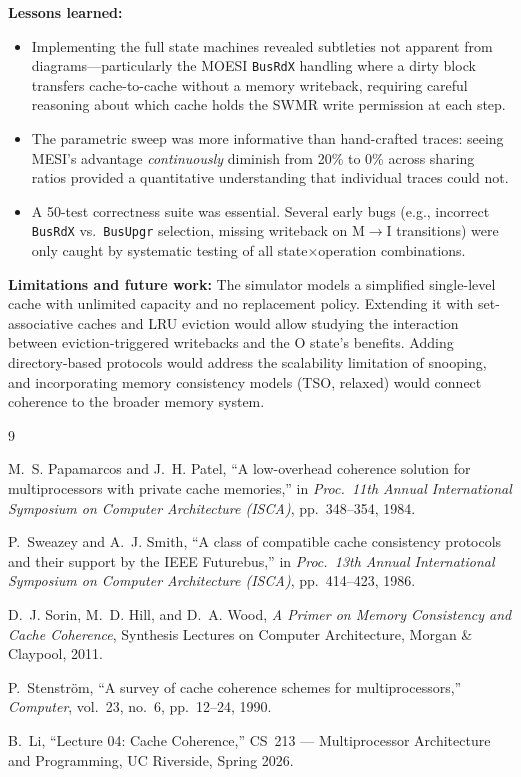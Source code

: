 \documentclass[10pt,twocolumn]{article}
\begin{document}
\textbf{Lessons learned:}
\begin{itemize}[nosep]
  \item Implementing the full state machines revealed subtleties not apparent from diagrams---particularly the MOESI \texttt{BusRdX} handling where a dirty block transfers cache-to-cache without a memory writeback, requiring careful reasoning about which cache holds the SWMR write permission at each step.
  \item The parametric sweep was more informative than hand-crafted traces: seeing MESI's advantage \emph{continuously} diminish from 20\% to 0\% across sharing ratios provided a quantitative understanding that individual traces could not.
  \item A 50-test correctness suite was essential. Several early bugs (e.g., incorrect \texttt{BusRdX} vs.\ \texttt{BusUpgr} selection, missing writeback on M$\to$I transitions) were only caught by systematic testing of all state$\times$operation combinations.
\end{itemize}

\textbf{Limitations and future work:} The simulator models a simplified single-level cache with unlimited capacity and no replacement policy. Extending it with set-associative caches and LRU eviction would allow studying the interaction between eviction-triggered writebacks and the O state's benefits. Adding directory-based protocols would address the scalability limitation of snooping, and incorporating memory consistency models (TSO, relaxed) would connect coherence to the broader memory system.


\begin{thebibliography}{9}

M.~S. Papamarcos and J.~H. Patel,
``A low-overhead coherence solution for multiprocessors with private cache memories,''
in \emph{Proc.\ 11th Annual International Symposium on Computer Architecture (ISCA)}, pp.~348--354, 1984.

P.~Sweazey and A.~J. Smith,
``A class of compatible cache consistency protocols and their support by the IEEE Futurebus,''
in \emph{Proc.\ 13th Annual International Symposium on Computer Architecture (ISCA)}, pp.~414--423, 1986.

D.~J. Sorin, M.~D. Hill, and D.~A. Wood,
\emph{A Primer on Memory Consistency and Cache Coherence},
Synthesis Lectures on Computer Architecture, Morgan \& Claypool, 2011.

P.~Stenstr{\"o}m,
``A survey of cache coherence schemes for multiprocessors,''
\emph{Computer}, vol.~23, no.~6, pp.~12--24, 1990.

B.~Li, ``Lecture 04: Cache Coherence,''
CS~213 --- Multiprocessor Architecture and Programming, UC Riverside, Spring 2026.

\end{thebibliography}
\end{document}
